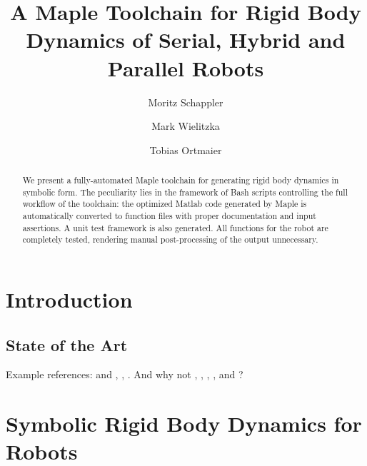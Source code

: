 \documentclass[runningheads]{llncs}
\begin{document}
%
\title{A Maple Toolchain for Rigid Body Dynamics of Serial, Hybrid and Parallel Robots}%
%
%
\author{Moritz Schappler \and Mark Wielitzka \and Tobias Ortmaier}%
%
%
%
\maketitle              %
%
\begin{abstract}
We present a fully-automated Maple toolchain for generating rigid body dynamics in symbolic form.
The peculiarity lies in the framework of Bash scripts controlling the full workflow of the toolchain: the optimized Matlab code generated by Maple is automatically converted to function files with proper documentation and input assertions.
A unit test framework is also generated.
All functions for the robot are completely tested, rendering manual post-processing of the output unnecessary. 

\end{abstract}
%
%
%
\section{Introduction}

\subsection{State of the Art}

Example references: \cite{KhalilCre1997,KhalilVijKhoMuk2014,SaminFis2013} and \cite{ZobovaHabVanDal2017}, \cite{BethgeMalTsaCal2017}, \cite{Docquier2013}. And why not \cite{FisettePosSasSam2002}, \cite{WangGonMunFis2019}, \cite{ShiMcP2000}, \cite{SousaCor2012}, \cite{Corke1998} and \cite{Robotran2020}?

\section{Symbolic Rigid Body Dynamics for Robots}
\end{document}
